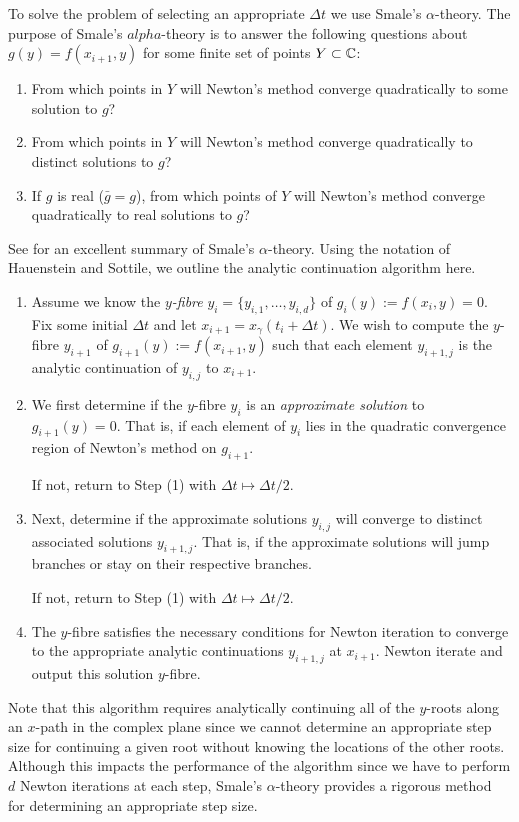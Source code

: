 To solve the problem of selecting an appropriate $\Delta t$ we use
Smale's $\alpha$-theory. The purpose of
Smale's $alpha$-theory is to answer the following questions about $g(y)
= f(x_{i+1},y)$ for some finite set of points $Y \subset \operatorname{\mathbb{C}}$:
\begin{enumerate}
  \item From which points in $Y$ will Newton's method converge
    quadratically to some solution to $g$?
  \item From which points in $Y$ will Newton's method converge
    quadratically to distinct solutions to $g$?
  \item If $g$ is real ($\bar{g} = g$), from which points of $Y$ will
    Newton's method converge quadratically to real solutions to $g$?
\end{enumerate}
See \cite{HauensteinSottile10} for an excellent summary of Smale's
$\alpha$-theory. Using the notation of Hauenstein and Sottile, we
outline the analytic continuation algorithm here.
\begin{enumerate}
  \item Assume we know the {\it $y$-fibre} $y_i =
    \{y_{i,1},\ldots,y_{i,d}\}$ of $g_i(y) := f(x_i,y)=0$. Fix some
    initial $\Delta t$ and let $x_{i+1} = x_\gamma(t_i + \Delta t)$. We
    wish to compute the $y$-fibre $y_{i+1}$ of $g_{i+1}(y) :=
    f(x_{i+1},y)$ such that each element $y_{i+1,j}$ is the analytic
    continuation of $y_{i,j}$ to $x_{i+1}$.
  \item We first determine if the $y$-fibre $y_i$ is an {\it approximate
    solution} to $g_{i+1}(y) = 0$. That is, if each element of $y_i$
    lies in the quadratic convergence region of Newton's method on
    $g_{i+1}$.

    If not, return to Step (1) with $\Delta t \mapsto \Delta t / 2$.
  \item Next, determine if the approximate solutions $y_{i,j}$ will
    converge to distinct associated solutions $y_{i+1,j}$. That is, if
    the approximate solutions will jump branches or stay on their
    respective branches.

    If not, return to Step (1) with $\Delta t \mapsto \Delta t / 2$.
  \item The $y$-fibre satisfies the necessary conditions for Newton
    iteration to converge to the appropriate analytic continuations
    $y_{i+1,j}$ at $x_{i+1}$. Newton iterate and output this solution
    $y$-fibre.
\end{enumerate}

Note that this algorithm requires analytically continuing all of the
$y$-roots along an $x$-path in the complex plane since we cannot
determine an appropriate step size for continuing a given root without
knowing the locations of the other roots. Although this impacts the
performance of the algorithm since we have to perform $d$ Newton
iterations at each step, Smale's $\alpha$-theory provides a rigorous
method for determining an appropriate step size.

